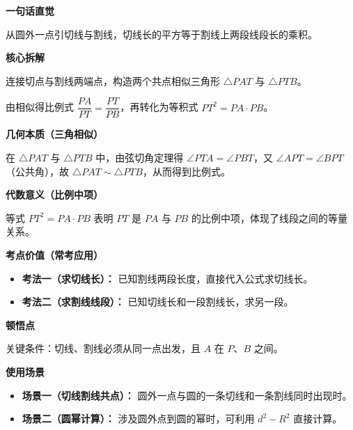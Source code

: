 \begin{explanationbox}
	\textbf{\textcolor{CExplanation}{一句话直觉}}

	从圆外一点引切线与割线，切线长的平方等于割线上两段线段长的乘积。

	\medskip
	\textbf{\textcolor{CExplanation}{核心拆解}}
	\begin{description}[style=nextline, leftmargin=2.8em, labelsep=0.5em, itemsep=0.45em]
		\item[\textbf{要点一（相似构造）：}] 连接切点与割线两端点，构造两个共点相似三角形 $\triangle PAT$ 与 $\triangle PTB$。
		\item[\textbf{要点二（等积变形）：}] 由相似得比例式 $\dfrac{PA}{PT}=\dfrac{PT}{PB}$，再转化为等积式 $PT^{2}=PA\cdot PB$。
	\end{description}

	\medskip
	\textbf{\textcolor{CExplanation}{几何本质（三角相似）}}

	在 $\triangle PAT$ 与 $\triangle PTB$ 中，由弦切角定理得 $\angle PTA=\angle PBT$，又 $\angle APT=\angle BPT$（公共角），故 $\triangle PAT\sim\triangle PTB$，从而得到比例式。

	\medskip
	\textbf{\textcolor{CExplanation}{代数意义（比例中项）}}

	等式 $PT^{2}=PA\cdot PB$ 表明 $PT$ 是 $PA$ 与 $PB$ 的比例中项，体现了线段之间的等量关系。

	\medskip
	\textbf{\textcolor{CExplanation}{考点价值（常考应用）}}
	\begin{itemize}[leftmargin=*, itemsep=0.5em, topsep=0.4em]
		\item \textbf{考法一（求切线长）：} 已知割线两段长度，直接代入公式求切线长。
		\item \textbf{考法二（求割线线段）：} 已知切线长和一段割线长，求另一段。
	\end{itemize}

	\medskip
	\textbf{\textcolor{CExplanation}{顿悟点}}

	关键条件：切线、割线必须从同一点出发，且 $A$ 在 $P$、$B$ 之间。

	\medskip
	\textbf{\textcolor{CExplanation}{使用场景}}
	\begin{itemize}[leftmargin=*, itemsep=0.5em, topsep=0.4em]
		\item \textbf{场景一（切线割线共点）：} 圆外一点与圆的一条切线和一条割线同时出现时。
		\item \textbf{场景二（圆幂计算）：} 涉及圆外点到圆的幂时，可利用 $d^{2}-R^{2}$ 直接计算。
	\end{itemize}
\end{explanationbox}
